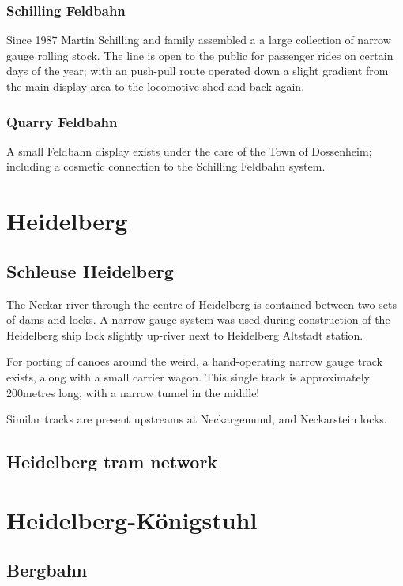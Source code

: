 \documentclass[a4paper]{report}
\begin{document}
\subsubsection{Schilling Feldbahn}

Since 1987 Martin Schilling and family assembled a a large collection
of narrow gauge rolling stock.  The line is open to the public for
passenger rides on certain days of the year; with an push-pull route
operated down a slight gradient from the main display area to the
locomotive shed and back again.

\subsubsection{Quarry Feldbahn}

A small Feldbahn display exists under the care of the Town of
Dossenheim; including a cosmetic connection to the Schilling Feldbahn system.

\section{Heidelberg}

\subsection{Schleuse Heidelberg}

The Neckar river through the centre of Heidelberg is contained between
two sets of dams and locks.  A narrow gauge system was used during
construction of the Heidelberg ship lock slightly up-river next to
Heidelberg Altstadt station.

For porting of canoes around the weird, a hand-operating narrow gauge
track exists, along with a small carrier wagon.  This single track is
approximately 200metres long, with a narrow tunnel in the middle!

Similar tracks are present upstreams at Neckargemund, and Neckarstein locks.

\subsection{Heidelberg tram network}

\section{Heidelberg-Königstuhl}

\subsection{Bergbahn}
\end{document}
